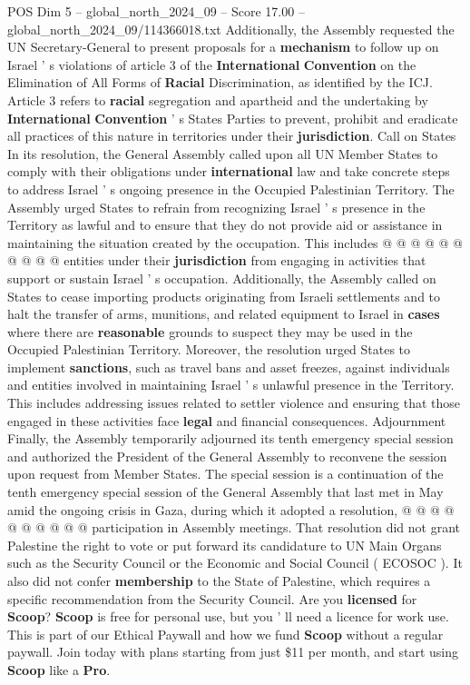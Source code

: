 \begin{textsample}{POS Dim 5 – global\_north\_2024\_09 – Score 17.00 – global\_north\_2024\_09/114366018.txt}
Additionally, the Assembly requested the UN Secretary-General to present proposals for a \textbf{mechanism} to follow up on Israel ' s violations of article 3 of the \textbf{International} \textbf{Convention} on the Elimination of All Forms of \textbf{Racial} Discrimination, as identified by the ICJ.
Article 3 refers to \textbf{racial} segregation and apartheid and the undertaking by \textbf{International} \textbf{Convention} ' s States Parties to prevent, prohibit and eradicate all practices of this nature in territories under their \textbf{jurisdiction}.
Call on States In its resolution, the General Assembly called upon all UN Member States to comply with their obligations under \textbf{international} law and take concrete steps to address Israel ' s ongoing presence in the Occupied Palestinian Territory.
The Assembly urged States to refrain from recognizing Israel ' s presence in the Territory as lawful and to ensure that they do not provide aid or assistance in maintaining the situation created by the occupation.
This includes @ @ @ @ @ @ @ @ @ @ entities under their \textbf{jurisdiction} from engaging in activities that support or sustain Israel ' s occupation.
Additionally, the Assembly called on States to cease importing products originating from Israeli settlements and to halt the transfer of arms, munitions, and related equipment to Israel in \textbf{cases} where there are \textbf{reasonable} grounds to suspect they may be used in the Occupied Palestinian Territory.
Moreover, the resolution urged States to implement \textbf{sanctions}, such as travel bans and asset freezes, against individuals and entities involved in maintaining Israel ' s unlawful presence in the Territory.
This includes addressing issues related to settler violence and ensuring that those engaged in these activities face \textbf{legal} and financial consequences.
Adjournment Finally, the Assembly temporarily adjourned its tenth emergency special session and authorized the President of the General Assembly to reconvene the session upon request from Member States.
The special session is a continuation of the tenth emergency special session of the General Assembly that last met in May amid the ongoing crisis in Gaza, during which it adopted a resolution, @ @ @ @ @ @ @ @ @ @ participation in Assembly meetings.
That resolution did not grant Palestine the right to vote or put forward its candidature to UN Main Organs such as the Security Council or the Economic and Social Council ( ECOSOC ).
It also did not confer \textbf{membership} to the State of Palestine, which requires a specific recommendation from the Security Council.
Are you \textbf{licensed} for \textbf{Scoop}? \textbf{Scoop} is free for personal use, but you ' ll need a licence for work use.
This is part of our Ethical Paywall and how we fund \textbf{Scoop} without a regular paywall.
Join today with plans starting from just \$11 per month, and start using \textbf{Scoop} like a \textbf{Pro}.

\end{textsample}
